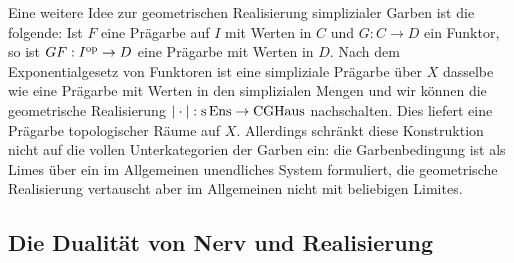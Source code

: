 \begin{bem}
  Eine weitere Idee zur geometrischen Realisierung simplizialer Garben
  ist die folgende: Ist $F$ eine Prägarbe auf $I$ mit Werten in $C$
  und $G: C \to D$ ein Funktor, so ist $GF: I^\mathrm{op} \to D$ eine Prägarbe
  mit Werten in $D$. Nach dem Exponentialgesetz von Funktoren ist eine
  simpliziale Prägarbe über $X$ dasselbe wie eine Prägarbe mit Werten
  in den simplizialen Mengen und wir können die geometrische
  Realisierung $|\cdot|: \operatorname{s}\operatorname{Ens} \to \operatorname{CGHaus}$ nachschalten. Dies
  liefert eine Prägarbe topologischer Räume auf $X$. Allerdings
  schränkt diese Konstruktion nicht auf die vollen Unterkategorien der
  Garben ein: die Garbenbedingung ist als Limes über ein im
  Allgemeinen unendliches System formuliert, die geometrische
  Realisierung vertauscht aber im Allgemeinen nicht mit beliebigen
  Limites.
\end{bem}

\subsection{Die Dualität von Nerv und Realisierung}

